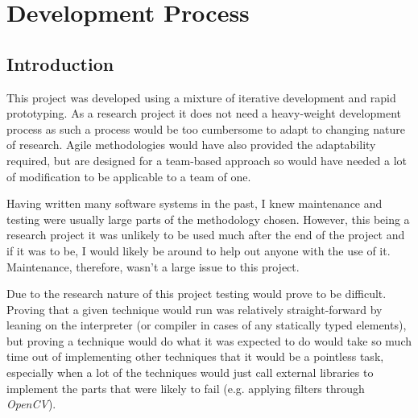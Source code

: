 \chapter{Development Process}




\section{Introduction}
This project was developed using a mixture of iterative development and rapid prototyping. As a
research project it does not need a heavy-weight development process as such a process would be
too cumbersome to adapt to changing nature of research. Agile methodologies would have also 
provided the adaptability required, but are designed for a team-based approach so would have
needed a lot of modification to be applicable to a team of one.

Having written many software systems in the past, I knew maintenance and testing were usually 
large parts of the methodology chosen. However, this being a research project it was unlikely to
be used much after the end of the project and if it was to be, I would likely be around to help 
out anyone with the use of it. Maintenance, therefore, wasn't a large issue to this project.

Due to the research nature of this project testing would prove to be difficult. Proving that a
given technique would run was relatively straight-forward by leaning on the interpreter (or 
compiler in cases of any statically typed elements), but proving a technique would do what it was
expected to do would take so much time out of implementing other techniques that it would be a 
pointless task, especially when a lot of the techniques would just call external libraries to
implement the parts that were likely to fail (e.g. applying filters through \emph{OpenCV}).

